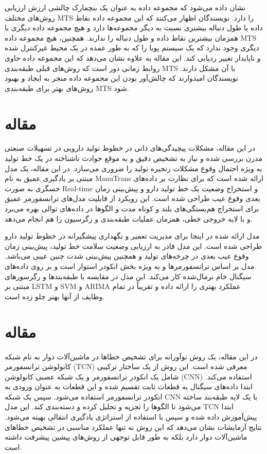 \documentclass[a4paper,10pt]{article}
\begin{document}
نشان داده می‌شود که مجموعه داده  به عنوان یک بنچمارک چالشی ارزش ارزیابی روش‌های مختلف MTS را دارد. نویسندگان اظهار می‌کنند که این مجموعه داده نقاط داده یا طول دنباله بیشتری نسبت به دیگر مجموعه‌ها دارد و هیچ مجموعه داده دیگری با همزمان بیشترین نقاط داده و طول دنباله را ندارند. همچنین، هیچ مجموعه داده MTS دیگری وجود ندارد که یک سیستم پویا را که به طور عمده در یک محیط غیرکنترل شده و ناپایدار تغییر ردیابی کند. این مقاله به علاوه نشان می‌دهد که این مجموعه داده حاوی روابط زمانی دور است که روش‌های قبلی طبقه‌بندی MTS با آن مشکل دارند. نویسندگان امیدوارند که چالش‌آور بودن این مجموعه داده منجر به ایجاد و بهبود روش‌های بهتر برای طبقه‌بندی MTS شود.


	\section{مقاله \textcolor{blue}{\cite{article10}}}
در این مقاله، مشکلات پیچیدگی‌های ذاتی در خطوط تولید دارویی در تسهیلات صنعتی مدرن بررسی شده و نیاز به تشخیص دقیق و به موقع حوادث ناشناخته در یک خط تولید به ویژه احتمال وقوع مشکلات زنجیره تولید را ضروری می‌سازد. در این مقاله، یک مدل مبتنی بر یادگیری عمیق به نام ManuTrans ارائه شده است که برای نظارت بر داده‌های حسگری به صورت Real-time و استخراج وضعیت یک خط تولید دارو و پیش‌بینی زمان بعدی وقوع عیب طراحی شده است. این رویکرد از قابلیت مدل‌های ترانسفورمر عمیق برای استخراج هم‌بستگی‌های بلند و کوتاه مدت و الگوها در داده‌های توالی بهره می‌برد و با لایه خروجی خطی، همزمان عملیات طبقه‌بندی و رگرسیون را هم انجام می‌دهد.

مدل ارائه شده در اینجا برای مدیریت تعمیر و نگهداری پیشگیرانه در خطوط تولید دارو طراحی شده است. این مدل قادر به ارزیابی وضعیت سلامت خط تولید، پیش‌بینی زمان وقوع عیب بعدی در چرخه‌های تولید و همچنین پیش‌بینی شدت چنین عیبی می‌باشد. مدل بر اساس ترانسفورمرها و به ویژه بخش انکودر استوار است و بر روی داده‌های سیگنال خام نرمال‌شده کار می‌کند. این مدل در مقایسه با طبقه‌بند‌ها و رگرسورهای مبتنی بر LSTM و SVM و ARIMA عملکرد بهتری را ارائه داده و تقریباً در تمام وظایف از آنها بهتر جلو زده است.


	\section{مقاله \textcolor{blue}{\cite{article15}}}
در این مقاله، یک روش نوآورانه برای تشخیص خطاها در ماشین‌آلات دوار به نام شبکه کانولوشن ترانسفورمر (TCN) معرفی شده است. این روش از یک ساختار ترکیبی شامل یک انکودر ترانسفورمر و یک شبکه عصبی کانولوشن (CNN) استفاده می‌کند. ابتدا داده‌های سیگنال به قطعات ثابت تقسیم شده و این قطعات به عنوان ورودی به انکودر ترانسفورمر استفاده می‌شود. سپس یک شبکه CNN با یک لایه طبقه‌بند ساخته می‌شود تا الگوها را تجزیه و تحلیل کرده و دسته‌بندی کند. این مدل TCN ابتدا پیش‌آموزش داده شده و سپس با استفاده از استراتژی یادگیری انتقالی بهینه می‌شود. نتایج آزمایشات نشان می‌دهد که این روش نه تنها عملکرد مناسبی در تشخیص خطاهای ماشین‌آلات دوار دارد بلکه به طور قابل توجهی از روش‌های پیشین پیشرفت داشته است.
\end{document}

